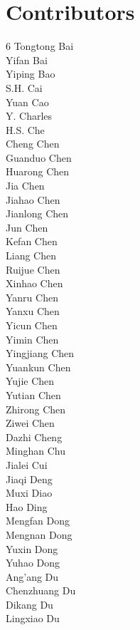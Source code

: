 \documentclass{article}
\begin{document}
\vspace*{-1.2cm}
\section{Contributors}
\vspace*{-2ex}
\begin{multicols}{6}
{\fontsize{9}{10}\selectfont
Tongtong Bai\\
Yifan Bai\\
Yiping Bao\\
S.H. Cai\\
Yuan Cao\\
Y. Charles\\
H.S. Che\\
Cheng Chen\\
Guanduo Chen\\
Huarong Chen\\
Jia Chen\\
Jiahao Chen\\
Jianlong Chen\\
Jun Chen\\
Kefan Chen\\
Liang Chen\\
Ruijue Chen\\
Xinhao Chen\\
Yanru Chen\\
Yanxu Chen\\
Yicun Chen\\
Yimin Chen\\
Yingjiang Chen\\
Yuankun Chen\\
Yujie Chen\\
Yutian Chen\\
Zhirong Chen\\
Ziwei Chen\\
Dazhi Cheng\\
Minghan Chu\\
Jialei Cui\\
Jiaqi Deng\\
Muxi Diao\\
Hao Ding\\
Mengfan Dong\\
Mengnan Dong\\
Yuxin Dong\\
Yuhao Dong\\
Ang'ang Du\\
Chenzhuang Du\\
Dikang Du\\
Lingxiao Du\\
}
\end{multicols}
\end{document}
